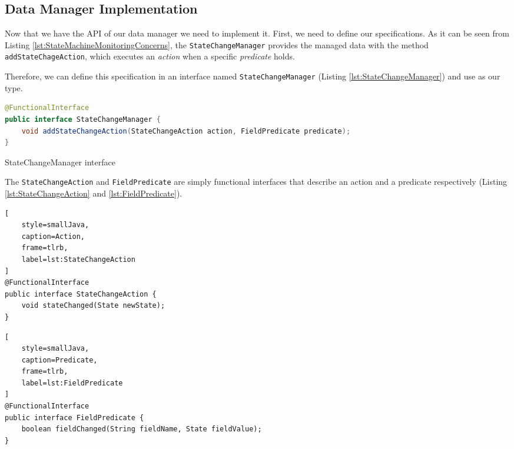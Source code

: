 \subsection{Data Manager Implementation}
Now that we have the API of our data manager we need to implement it.
First, we need to define our specifications.
As it can be seen from Listing \ref{lst:StateMachineMonitoringConcerns}, the \texttt{StateChangeManager} provides the managed data with the method \texttt{addStateChageAction}, which executes an \textit{action} when a specific \textit{predicate} holds.

Therefore, we can define this specification in an interface named \texttt{StateChangeManager} (Listing \ref{lst:StateChangeManager}) and use as our type.

\begin{sourcecode} [H]
	\begin{lstlisting}[language=Java, escapechar=|]
@FunctionalInterface
public interface StateChangeManager {
	void addStateChangeAction(StateChangeAction action, FieldPredicate predicate);
}
	\end{lstlisting}
	\caption{StateChangeManager interface}
	\label{lst:StateChangeManager}
\end{sourcecode}

The \texttt{StateChangeAction} and \texttt{FieldPredicate} are simply functional interfaces that describe an action and a predicate respectively (Listing \ref{lst:StateChangeAction} and \ref{lst:FieldPredicate}).


\noindent\begin{minipage}{.45\textwidth}
\begin{lstlisting}[
	style=smallJava,
	caption=Action,
	frame=tlrb,
	label=lst:StateChangeAction
]
@FunctionalInterface
public interface StateChangeAction {
	void stateChanged(State newState);
}
\end{lstlisting}

\end{minipage}\hfill
\begin{minipage}{.50\textwidth}
\begin{lstlisting}[
	style=smallJava,
	caption=Predicate,
	frame=tlrb,
	label=lst:FieldPredicate
]
@FunctionalInterface
public interface FieldPredicate {
	boolean fieldChanged(String fieldName, State fieldValue);
}
	\end{lstlisting}
\end{minipage}

